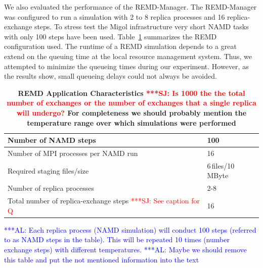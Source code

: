 \documentclass{rspublic}
\newcommand{\up}{}%
\newcommand{\alnote}[1]{ {\textcolor{blue} { ***AL: #1 }}}
\newcommand{\jhanote}[1]{ {\textcolor{red} { ***SJ: #1 }}}
\newcommand{\alnote}[1]{}
\newcommand{\jhanote}[1]{}
\begin{document}
We also evaluated the performance of the REMD-Manager.  The
REMD-Manager was configured to run a simulation with 2 to 8 replica
processes and 16 replica-exchange steps. To stress test the Migol
infrastructure very short NAMD tasks with only 100 steps have been
used. Table~\ref{tab:app_stats} summarizes the REMD configuration
used. The runtime of a REMD simulation depends to a great extend on
the queuing time at the local resource management system. Thus, we attempted 
to minimize the queueing times during our experiment. However, as the results 
show, small queueing delays could not always be avoided.
\begin{table}
    \centering
	\begin{tabular}{|p{5cm}|l|}
          \hline
          Number of NAMD steps &100\\ \hline 
          Number of MPI processes per NAMD run &16\\ \hline 
          Required staging files/size &6\,files/10\,MByte\\ \hline
          Number of replica processes &2-8 \\ \hline
          Total number of replica-exchange steps \jhanote{See caption for Q} &16\\ \hline
	\end{tabular}
	\caption{\footnotesize \bf REMD Application Characteristics\label{tab:app_stats}
          \jhanote{Is 1000 the the total number of exchanges or the
            number of exchanges that a single replica will undergo?}
          For completeness we should probably mention the temperature
          range over which simulations were performed}
          \alnote{Each replica process (NAMD simulation) will conduct 
          100 steps (referred to as NAMD steps in the table). This 
          will be repeated 10 times (number exchange steps) with 
          different temperatures.}         
          \alnote{Maybe we should remove this table and put the not mentioned information 
          into the text}
          \up\up
\end{table}   
\end{document}
